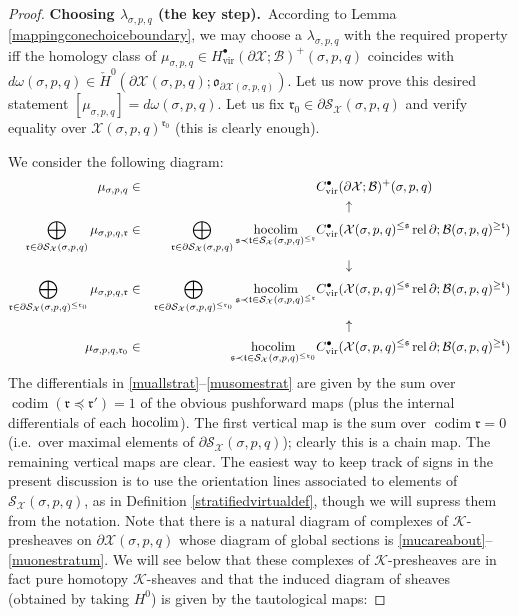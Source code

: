 \documentclass[12pt]{article}
\theoremstyle{definition}
\theoremstyle{remark}
\numberwithin{equation}{subsection}
\newcommand{\K}{\mathcal K}
\newcommand{\s}{\mathfrak s}
\newcommand{\ttt}{\mathfrak t}
\newcommand{\rr}{\mathfrak r}
\newcommand{\oo}{\mathfrak o}
\newcommand{\X}{\mathcal X}
\newcommand{\SSS}{\mathcal S}
\newcommand{\B}{\mathcal B}
\newcommand{\cH}{\check H}
\newcommand{\hocolim}{\operatornamewithlimits{hocolim}}
\newcommand{\codim}{\operatorname{codim}}
\newcommand{\vir}{\mathrm{vir}}
\newcommand{\rel}{\operatorname{rel}}
\begin{document}
\begin{proof}
\textbf{Choosing $\lambda_{\sigma,p,q}$ (the key step).}\  According to Lemma \ref{mappingconechoiceboundary}, we may choose a $\lambda_{\sigma,p,q}$ with the required property iff the homology class of $\mu_{\sigma,p,q}\in H^\bullet_\vir(\partial\X;\B)^+(\sigma,p,q)$ coincides with $d\omega(\sigma,p,q)\in\cH^0(\partial\X(\sigma,p,q);\oo_{\partial\X(\sigma,p,q)})$.  Let us now prove this desired statement $[\mu_{\sigma,p,q}]=d\omega(\sigma,p,q)$.  Let us fix $\rr_0\in\partial\SSS_\X(\sigma,p,q)$ and verify equality over $\X(\sigma,p,q)^{\rr_0}$ (this is clearly enough).

We consider the following diagram:
\begin{align}
\label{mucareabout}\mu_{\sigma,p,q}\in&&&C_\vir^\bullet(\partial\X;\B)^+(\sigma,p,q)\\
&&&\qquad\uparrow\cr
\label{muallstrat}\bigoplus_{\rr\in\partial\SSS_\X(\sigma,p,q)}\mu_{\sigma,p,q,\rr}\in&&\bigoplus_{\rr\in\partial\SSS_\X(\sigma,p,q)}\hocolim_{\s\prec\ttt\in\SSS_\X(\sigma,p,q)^{\leq\rr}}&C_\vir^\bullet(\X(\sigma,p,q)^{\leq\s}\rel\partial;\B(\sigma,p,q)^{\geq\ttt})\\
&&&\qquad\downarrow\cr
\label{musomestrat}\bigoplus_{\rr\in\partial\SSS_\X(\sigma,p,q)^{\leq\rr_0}}\mu_{\sigma,p,q,\rr}\in&&\bigoplus_{\rr\in\partial\SSS_\X(\sigma,p,q)^{\leq\rr_0}}\hocolim_{\s\prec\ttt\in\SSS_\X(\sigma,p,q)^{\leq\rr}}&C_\vir^\bullet(\X(\sigma,p,q)^{\leq\s}\rel\partial;\B(\sigma,p,q)^{\geq\ttt})\\
&&&\qquad\uparrow\cr
\label{muonestratum}\mu_{\sigma,p,q,\rr_0}\in&&\hocolim_{\s\prec\ttt\in\SSS_\X(\sigma,p,q)^{\leq\rr_0}}&C_\vir^\bullet(\X(\sigma,p,q)^{\leq\s}\rel\partial;\B(\sigma,p,q)^{\geq\ttt})
\end{align}
The differentials in \eqref{muallstrat}--\eqref{musomestrat} are given by the sum over $\codim(\rr\preceq\rr')=1$ of the obvious pushforward maps (plus the internal differentials of each $\hocolim$).  The first vertical map is the sum over $\codim\rr=0$ (i.e.\ over maximal elements of $\partial\SSS_\X(\sigma,p,q)$); clearly this is a chain map.  The remaining vertical maps are clear.  The easiest way to keep track of signs in the present discussion is to use the orientation lines associated to elements of $\SSS_\X(\sigma,p,q)$, as in Definition \ref{stratifiedvirtualdef}, though we will supress them from the notation.  Note that there is a natural diagram of complexes of $\K$-presheaves on $\partial\X(\sigma,p,q)$ whose diagram of global sections is \eqref{mucareabout}--\eqref{muonestratum}.  We will see below that these complexes of $\K$-presheaves are in fact pure homotopy $\K$-sheaves and that the induced diagram of sheaves (obtained by taking $H^0$) is given by the tautological maps:

\end{proof}
\end{document}
